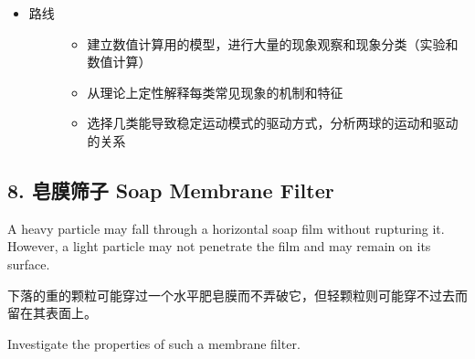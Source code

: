 \documentclass[a4paper,10pt,english]{sphinxmanual}
\begin{document}
\begin{itemize}
\item {} \begin{description}
\item[{路线}] \leavevmode\begin{itemize}
\item {} 
建立数值计算用的模型，进行大量的现象观察和现象分类（实验和数值计算）

\item {} 
从理论上定性解释每类常见现象的机制和特征

\item {} 
选择几类能导致稳定运动模式的驱动方式，分析两球的运动和驱动的关系

\end{itemize}

\end{description}

\end{itemize}


\subsection{8. 皂膜筛子 Soap Membrane Filter}
\label{\detokenize{7. Appendix:soap-membrane-filter}}
A heavy particle may fall through a horizontal soap film without rupturing it. However, a light particle may not penetrate the film and may remain on its surface.

下落的重的颗粒可能穿过一个水平肥皂膜而不弄破它，但轻颗粒则可能穿不过去而留在其表面上。

Investigate the properties of such a membrane filter.
\end{document}
